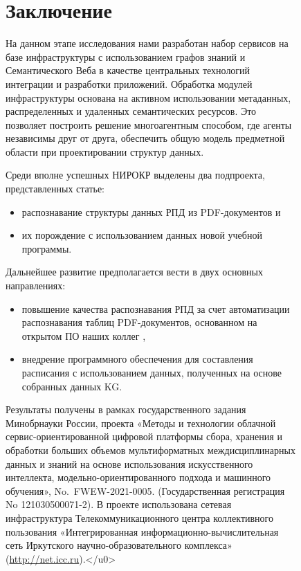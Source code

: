 \documentclass[ 

]{aiitart}
\begin{document}
\begin{figure}
\section*{Заключение} 

На данном этапе исследования нами разработан набор сервисов на базе инфраструктуры с использованием графов знаний и Семантического Веба в качестве центральных технологий интеграции и разработки приложений. Обработка модулей инфраструктуры основана на активном использовании метаданных, распределенных и удаленных семантических ресурсов. Это позволяет построить решение многоагентным способом, где агенты независимы друг от друга, обеспечить общую модель предметной области при проектировании структур данных. 

Среди вполне успешных НИРОКР выделены два подпроекта, представленных статье: 
\begin{itemize} \
\item распознавание структуры данных РПД из PDF-документов и 
\item их порождение с использованием данных новой учебной программы. 
\end{itemize} 
Дальнейшее развитие предполагается вести в двух основных направлениях: 
\begin{itemize} 
\item повышение качества распознавания РПД за счет автоматизации распознавания таблиц PDF-документов, основанном на открытом ПО наших коллег \cite{Shigarov_2016,Shigarov_2017}, 
\item внедрение программного обеспечения для составления расписания с использованием данных, полученных на основе собранных данных KG. 
\end{itemize} 


\begin{acknowledgments} 
Результаты получены в рамках государственного задания Минобрнауки России, проекта «Методы и технологии облачной сервис-ориентированной цифровой платформы сбора, хранения и обработки больших объемов мультиформатных междисциплинарных данных и знаний на основе использования искусственного интеллекта, модельно-ориентированного подхода и машинного обучения», No.~FWEW-2021-0005. (Государственная регистрация No 121030500071-2).  В проекте использована сетевая инфраструктура Телекоммуникационного центра коллективного пользования «Интегрированная информационно-вычислительная сеть Иркутского научно-образовательного комплекса» (\url{http://net.icc.ru}).</u0> 
\end{acknowledgments} 



\end{figure}
\end{document}
